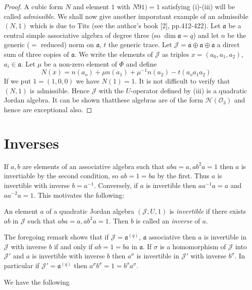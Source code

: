 \begin{proof}
A cubic form $N$ and element $1$ with $N91)=1$ satisfying (i)-(iii)
will be called {\em admissible}. We shall now give another imporatant
example of an admissible $(N,1)$ which is due to Tits (see the
author's book [2], pp.412-422). Let $\mathfrak{a}$ be a central simple
associative algebra of degree three (so $\dim\mathfrak{a}=q$) and let
$n$ be the generic ($=$ reduced) norm on $\mathfrak{a}$, $t$ the
generic trace. Let
$\mathscr{J}=\mathfrak{a}\oplus\mathfrak{a}\oplus\mathfrak{a}$ a
direct sum of three copies of $\mathfrak{a}$. We write the elements of
$\mathscr{J}$ as triples $x=(a_0,a_1,a_2)$, $a_i\in
\mathfrak{a}$. Let $\mu$ be a non-zero element of $\Phi$ and define
\begin{equation*}
  N(x)=n(a_o)+\mu n(a_1)+\mu^{-1}n(a_2)-t(a_oa_1a_2)\tag{51}\label{c1:eq51} 
\end{equation*}
If we put $1=(1,0,0)$ we have $N(1)=1$. It is not difficult to verify
that $(N,1)$ is admissible. Hence $\mathscr{J}$ with the $U$-operator
defined by (iii) is a quadratic Jordan algebra. It can be shown
that\pageoriginale these algebras are of the form 
$\mathscr{H}(\mathcal{O}_3)$ and hence are exceptional also. 
\end{proof}

\section{Inverses}\label{c1:sec10}

If $a,b$ are elements of an associative algebra such that $aba=a,
ab^{2}a=1$ then $a$ is invertiable by the second condition, so
$ab=1=ba$ by the first. Thus $a$ is invertible with inverse
$b=a^{-1}$. Conversely, if $a$ is invertible then $aa^{-1}a=a$ and
$aa^{-2}a=1$. This motivates the following:

\begin{defn}\label{c1:defn5}
An element $a$ of a quadratic Jordan algebra $(\mathscr{J},U,1)$ is
{\em invertible} if there exists $a b$ in $\mathscr{J}$ such that
$aba=a, ab^{2}a=1$. Then $b$ is called an {\em inverse} of $a$.

The foregoing remark shows that if $\mathscr{J}=\mathfrak{a}^{(q)}$,
$\mathfrak{a}$ associative then $a$ is invertible in $\mathscr{J}$
with inverse $b$ if and only if $ab=1=ba$ in $\mathfrak{a}$. If
$\sigma$ is a homomorphism of $\mathscr{J}$ into $\mathscr{J}'$ and
$a$ is invertible with inverse $b$ then $a^{\sigma}$ is invertible in
$\mathscr{J}'$ with inverse $b^{\sigma}$. In particular if
$\mathscr{J}'=\mathfrak{a}^{(q)}$ then
$a^{\sigma}b^{\sigma}=1=b^{\sigma}a^{\sigma}$. 
\end{defn}
We have the following


